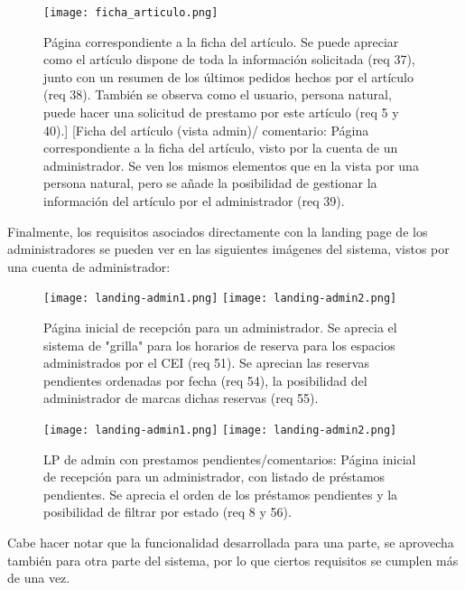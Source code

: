 \begin{figure}[H]
\texttt{[image: ficha\_articulo.png]}
\caption{Página correspondiente a la ficha del artículo. Se puede apreciar como el artículo dispone de toda la información solicitada (req 37), junto con un resumen de los últimos pedidos hechos por el artículo (req 38). También se observa como el usuario, persona natural, puede hacer una solicitud de prestamo por este artículo (req 5 y 40).]
[Ficha del artículo (vista admin)/ comentario: Página correspondiente a la ficha del artículo, visto por la cuenta de un administrador. Se ven los mismos elementos que en la vista por una persona natural, pero se añade la posibilidad de gestionar la información del artículo por el administrador (req 39).} 
\label{FichaArt}
\end{figure}

Finalmente, los requisitos asociados directamente con la landing page de los administradores se pueden ver en las siguientes imágenes del sistema, vistos por una cuenta de administrador:

\begin{figure}[H]
\texttt{[image: landing-admin1.png]}
\texttt{[image: landing-admin2.png]}
\caption{Página inicial de recepción para un administrador. Se aprecia el sistema de "grilla" para los horarios de reserva para los espacios administrados por el CEI (req 51). Se aprecian las reservas pendientes ordenadas por fecha (req 54), la posibilidad del administrador de marcas dichas reservas (req 55).} 
\label{LPAdmin}
\end{figure}


\begin{figure}[H]
\texttt{[image: landing-admin1.png]}
\texttt{[image: landing-admin2.png]}
\caption{LP de admin con prestamos pendientes/comentarios: Página inicial de recepción para un administrador, con listado de préstamos pendientes. Se aprecia el orden de los préstamos pendientes y la posibilidad de filtrar por estado (req 8 y 56).}
\label{LPAdmin2}
\end{figure}

Cabe hacer notar que la funcionalidad desarrollada para una parte, se aprovecha también para otra parte del sistema, por lo que ciertos requisitos se cumplen más de una vez.